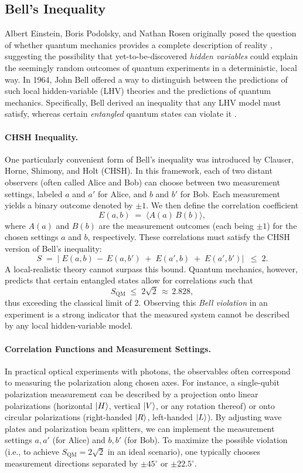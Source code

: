 \subsection{Bell's Inequality}
Albert Einstein, Boris Podolsky, and Nathan Rosen originally posed the question of whether quantum mechanics provides a complete description of reality \cite{EPR}, suggesting the possibility that yet-to-be-discovered \emph{hidden variables} could explain the seemingly random outcomes of quantum experiments in a deterministic, local way. In 1964, John Bell offered a way to distinguish between the predictions of such local hidden-variable (LHV) theories and the predictions of quantum mechanics. Specifically, Bell derived an inequality that any LHV model must satisfy, whereas certain \emph{entangled} quantum states can violate it \cite{Bell1964}. 

\paragraph{CHSH Inequality.}
One particularly convenient form of Bell’s inequality was introduced by Clauser, Horne, Shimony, and Holt (CHSH). In this framework, each of two distant observers (often called Alice and Bob) can choose between two measurement settings, labeled $a$ and $a'$ for Alice, and $b$ and $b'$ for Bob. Each measurement yields a binary outcome denoted by $\pm 1$. We then define the correlation coefficient 
\[
E(a,b) \;=\; \langle A(a) \, B(b) \rangle,
\]
where $A(a)$ and $B(b)$ are the measurement outcomes (each being $\pm1$) for the chosen settings $a$ and $b$, respectively. These correlations must satisfy the CHSH version of Bell's inequality:
\[
S \;=\; \bigl|\;E(a,b) \,-\,E(a,b') \;+\;E(a',b) \;+\;E(a',b')\bigr| \;\;\le\; 2.
\]
A local-realistic theory cannot surpass this bound. Quantum mechanics, however, predicts that certain entangled states allow for correlations such that
\[
S_{\mathrm{QM}} \;\le\; 2\sqrt{2}\,\approx\,2.828,
\]
thus exceeding the classical limit of 2. Observing this \emph{Bell violation} in an experiment is a strong indicator that the measured system cannot be described by any local hidden-variable model.

\paragraph{Correlation Functions and Measurement Settings.}
In practical optical experiments with photons, the observables often correspond to measuring the polarization along chosen axes. For instance, a single-qubit polarization measurement can be described by a projection onto linear polarizations (horizontal $\ket{H}$, vertical $\ket{V}$, or any rotation thereof) or onto circular polarizations (right-handed $\ket{R}$, left-handed $\ket{L}$). By adjusting wave plates and polarization beam splitters, we can implement the measurement settings $a,a'$ (for Alice) and $b,b'$ (for Bob). To maximize the possible violation (i.e., to achieve $S_{\mathrm{QM}}=2\sqrt{2}$ in an ideal scenario), one typically chooses measurement directions separated by $\pm45^\circ$ or $\pm22.5^\circ$. 

